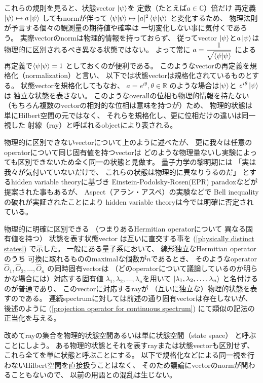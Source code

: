 これらの規則を見ると、状態vector $\ket{\psi}$を
定数（たとえば$a \in \mathbb{C}$）倍だけ
再定義
$\ket{\psi} \mapsto a \ket{\psi}$
してもnormが伴って
$\braket{\psi|\psi} \mapsto |a|^2 \braket{\psi|\psi}$
と変化するため、
物理法則が予言する個々の観測量の期待値や確率は
一切変化しない事に気付くであろう。
実際vectorのnormは物理的情報を持っておらず、
従ってvector $\ket{\psi}$と$a \ket{\psi}$は
物理的に区別されるべき異なる状態ではない。
よって常に
$a = \dfrac{1}{\sqrt{ \braket{\psi|\psi} }}$
による再定義で$\braket{\psi|\psi} = 1$
としておくのが便利である。
このようなvectorの再定義を規格化（normalization）と言い、
以下では状態vectorは規格化されているものとする。
状態vectorを規格化してもなお、
$a=e^{i\theta}, \theta\in \mathbb{R}$
のような場合は$\ket{\psi}$と
$e^{i\theta}\ket{\psi}$は
独立な状態を表さない。
このようなoverallの位相も物理的情報を持たない
（もちろん複数のvectorの相対的な位相は意味を持つが）ため、
物理的状態は単にHilbert空間の元ではなく、
それらを規格化し、更に位相だけの違いは同一視した
射線（ray）と呼ばれるobjectにより表される。

物理的に区別できないvectorについて上のように述べたが、
更に我々は任意のoperatorについて同じ固有値を持つvectorは
どのような物理量ないし実験によっても区別できないため全く同一の状態と見做す。
量子力学の黎明期には
「実は我々が気付いていないだけで、
これらの状態は物理的に異なりうるのだ」
とするhidden variable theoryに基づき
Einstein-Podolsky-Rosen(EPR) paradoxなどが提案された事もあるが、
Aspect（アラン・アスペ）の実験などで
Bell inequalityの破れが実証されたことにより
hidden variable theoryは今では明確に否定されている。

物理的に明確に区別できる
（つまりあるHermitian operatorについて
異なる固有値を持つ）
状態を表す状態vector
は互いに直交する事を
(\ref{physically distinct states})
で示した。
一般にある量子系において、
線形独立なHermitian operatorのうち
可換に取れるもののmaximalな個数が$n$であるとき、
そのようなoperator
$\hat{O}_1,\hat{O}_2,\dots,\hat{O}_n$
の同時固有vectorは
（どのoperatorについて議論しているのか明らかな場合には）対応する固有値
$\lambda_1, \lambda_2, \dots , \lambda_n$を用いて
$\ket{\lambda_1, \lambda_2, \dots , \lambda_n}$
と名付けるのが普通であり、
このvectorに対応するrayが
（互いに独立な）物理的状態を表すのである。
連続spectrumに対しては前述の通り固有vectorは存在しないが、
後述のように
(\ref{projection operator for continuous spectrum})
にて類似の記法の正当化を与える。

改めてrayの集合を物理的状態空間あるいは単に状態空間（state space）
と呼ぶことにしよう。
ある物理的状態とそれを表すrayまたは状態vectorも区別せず、
これら全てを単に状態と呼ぶことにする。
以下で規格化などによる同一視を行わないHilbert空間を直接扱うことはなく、
そのため議論にvectorのnormが関わることもないので、
以前の用語との混乱は生じない。

